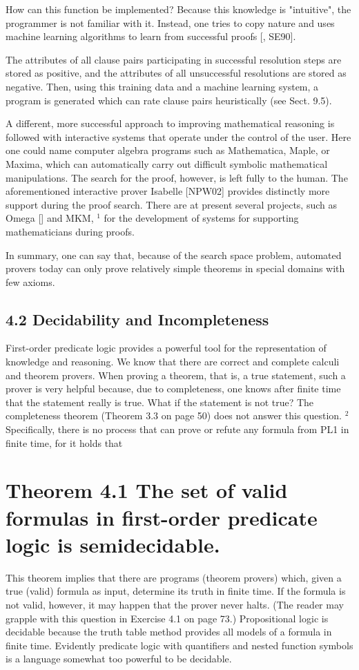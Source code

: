 \documentclass[10pt]{article}
\begin{document}
How can this function be implemented? Because this knowledge is "intuitive", the programmer is not familiar with it. Instead, one tries to copy nature and uses machine learning algorithms to learn from successful proofs [\cite{ertel1989learning}, SE90].

The attributes of all clause pairs participating in successful resolution steps are stored as positive, and the attributes of all unsuccessful resolutions are stored as negative. Then, using this training data and a machine learning system, a program is generated which can rate clause pairs heuristically (see Sect. 9.5).

A different, more successful approach to improving mathematical reasoning is followed with interactive systems that operate under the control of the user. Here one could name computer algebra programs such as Mathematica, Maple, or Maxima, which can automatically carry out difficult symbolic mathematical manipulations. The search for the proof, however, is left fully to the human. The aforementioned interactive prover Isabelle [NPW02] provides distinctly more support during the proof search. There are at present several projects, such as Omega [\cite{siekmann2004omega}] and MKM, ${ }^{1}$ for the development of systems for supporting mathematicians during proofs.

In summary, one can say that, because of the search space problem, automated provers today can only prove relatively simple theorems in special domains with few axioms.

\subsection*{4.2 Decidability and Incompleteness}
First-order predicate logic provides a powerful tool for the representation of knowledge and reasoning. We know that there are correct and complete calculi and theorem provers. When proving a theorem, that is, a true statement, such a prover is very helpful because, due to completeness, one knows after finite time that the statement really is true. What if the statement is not true? The completeness theorem (Theorem 3.3 on page 50) does not answer this question. ${ }^{2}$ Specifically, there is no process that can prove or refute any formula from PL1 in finite time, for it holds that

\section*{Theorem 4.1 The set of valid formulas in first-order predicate logic is semidecidable.}
This theorem implies that there are programs (theorem provers) which, given a true (valid) formula as input, determine its truth in finite time. If the formula is not valid, however, it may happen that the prover never halts. (The reader may grapple with this question in Exercise 4.1 on page 73.) Propositional logic is decidable because the truth table method provides all models of a formula in finite time. Evidently predicate logic with quantifiers and nested function symbols is a language somewhat too powerful to be decidable.
\end{document}
